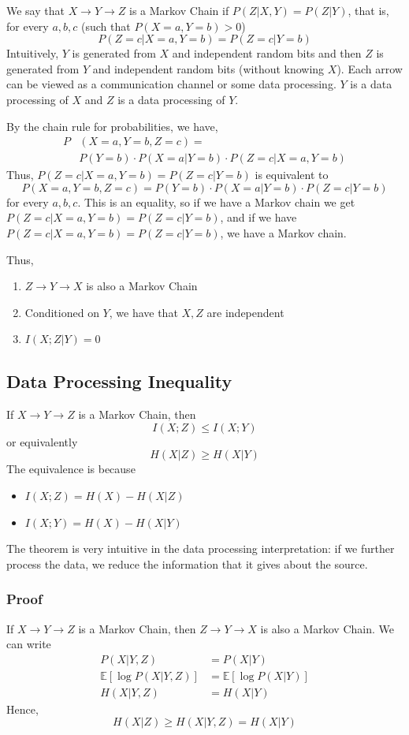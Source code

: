\documentclass{article}
\begin{document}
We say that $X\to Y\to Z$ is a Markov Chain if $P(Z|X,Y)=P(Z|Y)$, that is, for every $a,b,c$ (such that $P(X=a,Y=b)>0$)
\[
P(Z=c|X=a,Y=b)=P(Z=c|Y=b)
\]
Intuitively, $Y$ is generated from $X$ and independent random bits and then $Z$ is generated from $Y$ and independent random bits (without knowing $X$). Each arrow can be viewed as a communication channel or some data processing. $Y$ is a data processing of $X$ and $Z$ is a data processing of $Y$.

By the chain rule for probabilities, we have,
\begin{align*}
    P&(X=a,Y=b,Z=c)=\\
    & P(Y=b)\cdot P(X=a|Y=b)\cdot P(Z=c|X=a,Y=b)
\end{align*}
Thus, $P(Z=c|X=a,Y=b)=P(Z=c|Y=b)$ is equivalent to 
\[
P(X=a,Y=b,Z=c)=P(Y=b)\cdot P(X=a|Y=b)\cdot P(Z=c|Y=b)
\]
for every $a,b,c$. This is an equality, so if we have a Markov chain we get $P(Z=c|X=a,Y=b)=P(Z=c|Y=b)$, and if we have $P(Z=c|X=a,Y=b)=P(Z=c|Y=b)$, we have a Markov chain.

Thus,
\begin{enumerate}
    \item $Z\to Y\to X$ is also a Markov Chain 
    \item Conditioned on $Y$, we have that $X,Z$ are independent
    \item $I(X;Z|Y)=0$
\end{enumerate}

\subsection{Data Processing Inequality}

If $X\to Y\to Z$ is a Markov Chain, then 
\[
I(X;Z) \leq I(X;Y)
\]
or equivalently
\[
H(X|Z) \geq H(X|Y)
\]
The equivalence is because 
\begin{itemize}
    \item $I(X;Z)=H(X)-H(X|Z)$
    \item $I(X;Y)=H(X)-H(X|Y)$
\end{itemize}
The theorem is very intuitive in the data processing interpretation: if we further process the data, we reduce the information that it gives about the source.

\subsubsection{Proof}

If $X\to Y\to Z$ is a Markov Chain, then $Z\to Y\to X$ is also a Markov Chain. We can write 
\begin{align*}
    P(X|Y,Z) &= P(X|Y)\\
    \mathbb{E}\left[\log P(X|Y,Z)\right] &= \mathbb{E}\left[\log P(X|Y)\right]\\
    H(X|Y,Z) &= H(X|Y)
\end{align*}
Hence,
\[
H(X|Z) \geq H(X|Y,Z) = H(X|Y)
\]
\end{document}
